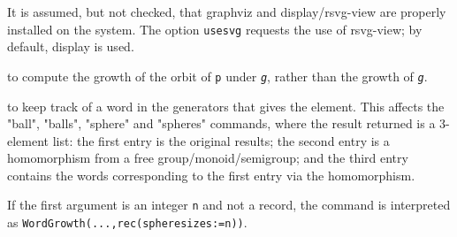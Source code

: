 \documentclass[a4paper,11pt]{report}
\begin{document}
{{{\begin{description}
 It is assumed, but not checked, that \textsf{graphviz} and \textsf{display}/\textsf{rsvg-view} are properly installed on the system. The option \texttt{usesvg} requests the use of \textsf{rsvg-view}; by default, \textsf{display} is used. 
\item[{\texttt{point:=p}}]  to compute the growth of the orbit of \texttt{p} under \mbox{\texttt{\mdseries\slshape g}}, rather than the growth of \mbox{\texttt{\mdseries\slshape g}}.
\item[{\texttt{track:=true}}]  to keep track of a word in the generators that gives the element. This affects
the "ball", "balls", "sphere" and "spheres" commands, where the result
returned is a 3-element list: the first entry is the original results; the
second entry is a homomorphism from a free group/monoid/semigroup; and the
third entry contains the words corresponding to the first entry via the
homomorphism.
\end{description}
 If the first argument is an integer \texttt{n} and not a record, the command is interpreted as \texttt{WordGrowth(...,rec(spheresizes:=n))}. 

}}}
\end{document}
